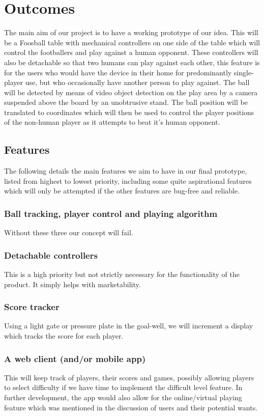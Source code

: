 \documentclass{article}
\begin{document}
\section{Outcomes}
The main aim of our project is to have a working prototype of our idea. This will be a Foosball table with mechanical controllers on one side of the table which will control the footballers and play against a human opponent. These controllers will also be detachable so that two humans can play against each other, this feature is for the users who would have the device in their home for predominantly single-player use, but who occasionally have another person to play against. The ball will be detected by means of video object detection on the play area by a camera suspended above the board by an unobtrusive stand. The ball position will be translated to coordinates which will then be used to control the player positions of the non-human player as it attempts to beat it's human opponent.  

\subsection{Features}
The following details the main features we aim to have in our final prototype, listed from highest to lowest priority, including some quite aspirational features which will only be attempted if the other features are bug-free and reliable. 
\subsubsection{Ball tracking, player control and playing algorithm} Without these three our concept will fail. 
\subsubsection{Detachable controllers} This is a high priority but not strictly necessary for the functionality of the product. It simply helps with marketability. 
\subsubsection{Score tracker} Using a light gate or pressure plate in the goal-well, we will increment a display which tracks the score for each player.
\subsubsection{A web client (and/or mobile app)} This will keep track of players, their scores and games, possibly allowing players to select difficulty if we have time to implement the difficult level feature. In further development, the app would also allow for the online/virtual playing feature which was mentioned in the discussion of users and their potential wants. 
\end{document}
